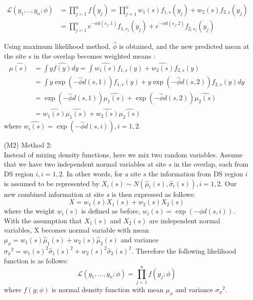 \documentclass[10pt]{article}
\theoremstyle{plain}
\theoremstyle{definition}
\theoremstyle{remark}
\begin{document}
\begin{align*}    
\mathcal{L} (y_1,..,y_n; \phi) &= \prod_{j=1}^{n} f(y_j) = \prod_{j=1}^{n}  w_{1}(s)f_{1,s}(y_j) + w_{2}(s)f_{2,s}(y_j)              \\
&         = \prod_{j=1}^{n} e^{-\phi d(s_j,1)}f_{1,s_j}(y_j) +  e^{-\phi d(s_j,2)}f_{2,s_j}(y_j)
\end{align*}




Using maximum likelihood method, $\hat{\phi}$ is obtained, and the new predicted mean at the site $s$ in the overlap becomes weighted means :
\begin{align}
\hat{\mu(s)} &=\int y \hat{f(y)} dy= \int \hat{w_{1}(s)}f_{1,s}(y)+\hat{w_{2}(s)}f_{2,s}(y) \\ & = 
\int   y \exp(-\hat{\phi} d(s,1))f_{1,s}(y)+y \exp(-\hat{\phi} d(s,2))f_{2,s}(y) dy \\ &=   \exp(-\hat{\phi} d(s,1))\hat{\mu_{1}(s)}+ \exp(-\hat{\phi} d(s,2)) \hat{\mu_{2}(s)} \\
&=\hat{w_{1}(s)}\hat{\mu_{1}(s)}+ \hat{w_{2}(s)}\hat{\mu_{2}(s)} \end{align}   where $\hat{w_{i}(s)}=\exp(-\hat{\phi} d(s,i)), i=1,2.$\\
\par (M2) Method 2:
\\ Instead of mixing density functions, here we mix two random variables. Assume that we have two independent normal variables at site $s$ in the overlap, each from DS region $i, i=1,2.$ In other words, for a site $s$  the information from DS region $i$  is assumed to be represented by $X_{i}(s) \sim N( {\hat \mu_{i}(s)}, {\hat \sigma_{i}(s)}   ),    i=1,2.$
Our new combined information at site $s$ is then expressed as follows:
\[ X= w_{1}(s)X_{1}(s)+w_{2}(s)X_{2}(s)\] where the weight $w_{i}(s)$ is defined as before,
$w_{i}(s)=\exp(-\phi d(s,i)).$
With the assumption that $X_{1}(s)$ and $X_{2}(s)$ are independent normal variables, X becomes normal variable 
with mean $ \mu_{\phi}=  w_{1}(s){\hat\mu_{1}(s)}+w_{2}(s){\hat\mu_{2}(s)}$ and variance $ {\sigma_{\phi}}^2={w_{1}(s)}^2{\hat\sigma_{1}(s)}^2+{w_{2}(s)}^2{\hat \sigma_{2}(s)}^2$. 
Therefore the following likelihood function is as follows:
\[  \mathcal{L} (y_1,...,y_n;\phi)= \prod_{j=1}^{n}f(y_j;\phi)  \] where $f(y;\phi)$ is normal density function with mean $\mu_{\phi}$ and variance
${\sigma_{\phi}}^2.$
\end{document}
